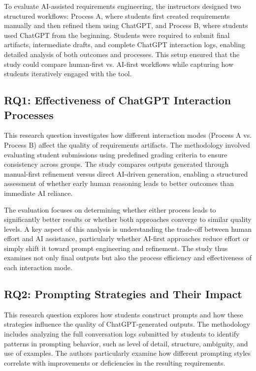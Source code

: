 To evaluate AI-assisted requirements engineering, the instructors designed two structured workflows: Process A, where students first created requirements manually and then refined them using ChatGPT, and Process B, where students used ChatGPT from the beginning. Students were required to submit final artifacts, intermediate drafts, and complete ChatGPT interaction logs, enabling detailed analysis of both outcomes and processes. This setup ensured that the study could compare human-first vs. AI-first workflows while capturing how students iteratively engaged with the tool.

\subsection{RQ1: Effectiveness of ChatGPT Interaction Processes}
This research question investigates how different interaction modes (Process A vs. Process B) affect the quality of requirements artifacts. The methodology involved evaluating student submissions using predefined grading criteria to ensure consistency across groups. The study compares outputs generated through manual-first refinement versus direct AI-driven generation, enabling a structured assessment of whether early human reasoning leads to better outcomes than immediate AI reliance.

The evaluation focuses on determining whether either process leads to significantly better results or whether both approaches converge to similar quality levels. A key aspect of this analysis is understanding the trade-off between human effort and AI assistance, particularly whether AI-first approaches reduce effort or simply shift it toward prompt engineering and refinement. The study thus examines not only final outputs but also the process efficiency and effectiveness of each interaction mode.

\subsection{RQ2: Prompting Strategies and Their Impact}
This research question explores how students construct prompts and how these strategies influence the quality of ChatGPT-generated outputs. The methodology includes analyzing the full conversation logs submitted by students to identify patterns in prompting behavior, such as level of detail, structure, ambiguity, and use of examples. The authors particularly examine how different prompting styles correlate with improvements or deficiencies in the resulting requirements.

